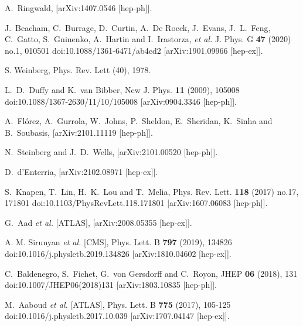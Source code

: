 \begin{thebibliography}{100}

 A.~Ringwald,
    [arXiv:1407.0546 [hep-ph]].

 J.~Beacham, C.~Burrage, D.~Curtin, A.~De Roeck, J.~Evans, J.~L.~Feng, C.~Gatto, S.~Gninenko, A.~Hartin and I.~Irastorza, \textit{et al.}
    J. Phys. G \textbf{47} (2020) no.1, 010501
    doi:10.1088/1361-6471/ab4cd2
    [arXiv:1901.09966 [hep-ex]].

 S. Weinberg, Phys. Rev. Lett (40), 1978.

 L.~D.~Duffy and K.~van Bibber,
    New J. Phys. \textbf{11} (2009), 105008
    doi:10.1088/1367-2630/11/10/105008
    [arXiv:0904.3346 [hep-ph]].

 A.~Fl\'orez, A.~Gurrola, W.~Johns, P.~Sheldon, E.~Sheridan, K.~Sinha and B.~Soubasis,
    [arXiv:2101.11119 [hep-ph]].

 N.~Steinberg and J.~D.~Wells,
    [arXiv:2101.00520 [hep-ph]].

 D.~d'Enterria,
    [arXiv:2102.08971 [hep-ex]].

 S.~Knapen, T.~Lin, H.~K.~Lou and T.~Melia,
    Phys. Rev. Lett. \textbf{118} (2017) no.17, 171801
    doi:10.1103/PhysRevLett.118.171801
    [arXiv:1607.06083 [hep-ph]].

 G.~Aad \textit{et al.} [ATLAS], [arXiv:2008.05355 [hep-ex]].

 A. M. Sirunyan \textit{et al.} [CMS],
    Phys. Lett. B \textbf{797} (2019), 134826
    doi:10.1016/j.physletb.2019.134826
    [arXiv:1810.04602 [hep-ex]].

 C.~Baldenegro, S.~Fichet, G.~von Gersdorff and C.~Royon,
    JHEP \textbf{06} (2018), 131
    doi:10.1007/JHEP06(2018)131
    [arXiv:1803.10835 [hep-ph]].

 M.~Aaboud \textit{et al.} [ATLAS],
    Phys. Lett. B \textbf{775} (2017), 105-125
    doi:10.1016/j.physletb.2017.10.039
    [arXiv:1707.04147 [hep-ex]].


\end{thebibliography}

